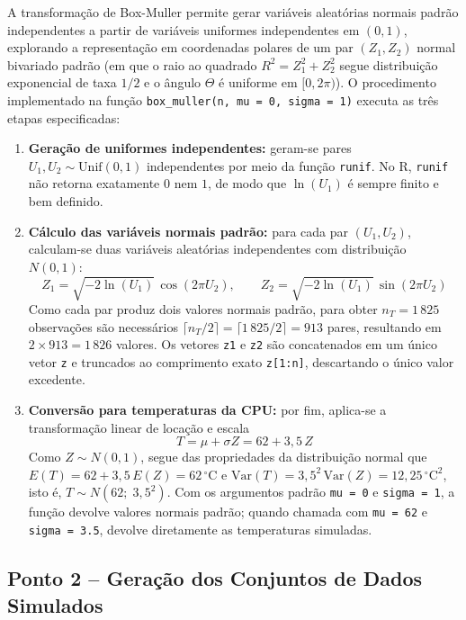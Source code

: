 \documentclass[10pt,a4paper]{article}
\begin{document}
A transformação de Box-Muller permite gerar variáveis aleatórias normais padrão independentes a partir de variáveis uniformes independentes em $(0, 1)$, explorando a representação em coordenadas polares de um par $(Z_1, Z_2)$ normal bivariado padrão (em que o raio ao quadrado $R^{2} = Z_1^{2} + Z_2^{2}$ segue distribuição exponencial de taxa $1/2$ e o ângulo $\Theta$ é uniforme em $[0, 2\pi)$). O procedimento implementado na função \texttt{box\_muller(n, mu = 0, sigma = 1)} executa as três etapas especificadas:
\begin{enumerate}[label=(\alph*)]
    \item \textbf{Geração de uniformes independentes:} geram-se pares $U_1, U_2 \sim \text{Unif}(0, 1)$ independentes por meio da função \texttt{runif}. No R, \texttt{runif} não retorna exatamente $0$ nem $1$, de modo que $\ln(U_1)$ é sempre finito e bem definido.
    \item \textbf{Cálculo das variáveis normais padrão:} para cada par $(U_1, U_2)$, calculam-se duas variáveis aleatórias independentes com distribuição $N(0, 1)$:
    \[
    Z_1 = \sqrt{-2 \ln(U_1)}\,\cos(2\pi U_2), \qquad Z_2 = \sqrt{-2 \ln(U_1)}\,\sin(2\pi U_2)
    \]
    Como cada par produz dois valores normais padrão, para obter $n_T = 1\,825$ observações são necessários $\lceil n_T / 2 \rceil = \lceil 1\,825 / 2 \rceil = 913$ pares, resultando em $2 \times 913 = 1\,826$ valores. Os vetores \texttt{z1} e \texttt{z2} são concatenados em um único vetor \texttt{z} e truncados ao comprimento exato \texttt{z[1:n]}, descartando o único valor excedente.
    \item \textbf{Conversão para temperaturas da CPU:} por fim, aplica-se a transformação linear de locação e escala
    \[
    \boxed{T = \mu + \sigma Z = 62 + 3{,}5\,Z}
    \]
    Como $Z \sim N(0, 1)$, segue das propriedades da distribuição normal que $E(T) = 62 + 3{,}5\,E(Z) = 62\,^\circ\text{C}$ e $\text{Var}(T) = 3{,}5^{2}\,\text{Var}(Z) = 12{,}25\,^\circ\text{C}^{2}$, isto é, $T \sim N(62;\; 3{,}5^{2})$. Com os argumentos padrão \texttt{mu = 0} e \texttt{sigma = 1}, a função devolve valores normais padrão; quando chamada com \texttt{mu = 62} e \texttt{sigma = 3.5}, devolve diretamente as temperaturas simuladas.
\end{enumerate}

\subsection{Ponto 2 -- Geração dos Conjuntos de Dados Simulados}
\end{document}
